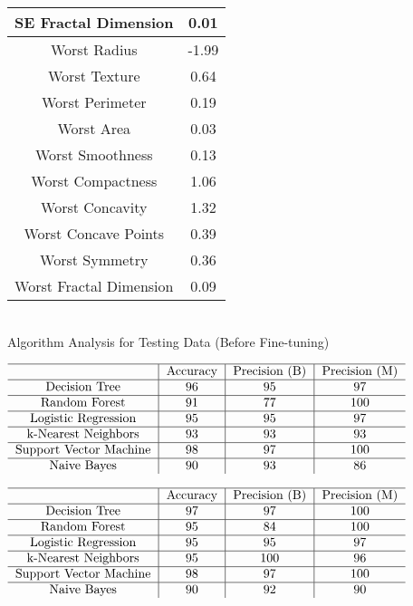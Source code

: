 \documentclass[conference]{IEEEtran}
\begin{document}
\begin{table*}
\begin{tabular}{c|c}
             \hline
             SE Fractal Dimension & 0.01\\
             \hline
             Worst Radius & -1.99\\
             \hline
             Worst Texture & 0.64\\
             \hline
             Worst Perimeter & 0.19\\
             \hline
             Worst Area & 0.03\\
             \hline
             Worst Smoothness & 0.13\\
             \hline
             Worst Compactness & 1.06\\
             \hline
             Worst Concavity & 1.32\\
             \hline
             Worst Concave Points & 0.39\\
             \hline
             Worst Symmetry & 0.36\\
             \hline
             Worst Fractal Dimension & 0.09
        \end{tabular}

\end{table*}

\begin{table*}
    \centering
    \caption{\\Algorithm Analysis for Testing Data (Before Fine-tuning)}
    $\begin{tabular}{c|c|c|c}
        \hline
        & Accuracy & Precision (B) & Precision (M)\\
        \hline
        Decision Tree & 96 & 95 & 97 \\
        \hline
        Random Forest & 91 & 77 & 100\\
        \hline
        Logistic Regression & 95 & 95 & 97 \\
        \hline
        k-Nearest Neighbors & 93 & 93 & 93\\
        \hline
        Support Vector Machine & 98 & 97 & 100 \\
        \hline
        Naive Bayes & 90 & 93 & 86\\
    \end{tabular}$

    \caption{\\Algorithm Analysis for Testing Data ({\textbf After Fine-tuning})}
    $\begin{tabular}{c|c|c|c}
        \hline
        & Accuracy & Precision (B) & Precision (M)\\
        \hline
        Decision Tree & 97 & 97 & 100 \\
        \hline
        Random Forest & 95 & 84 & 100\\
        \hline
        Logistic Regression & 95 & 95 & 97 \\
        \hline
        k-Nearest Neighbors & 95 & 100 & 96\\
        \hline
        Support Vector Machine & 98 & 97 & 100 \\
        \hline
        Naive Bayes & 90 & 92 & 90\\
    \end{tabular}$

\end{table*}
\end{document}

